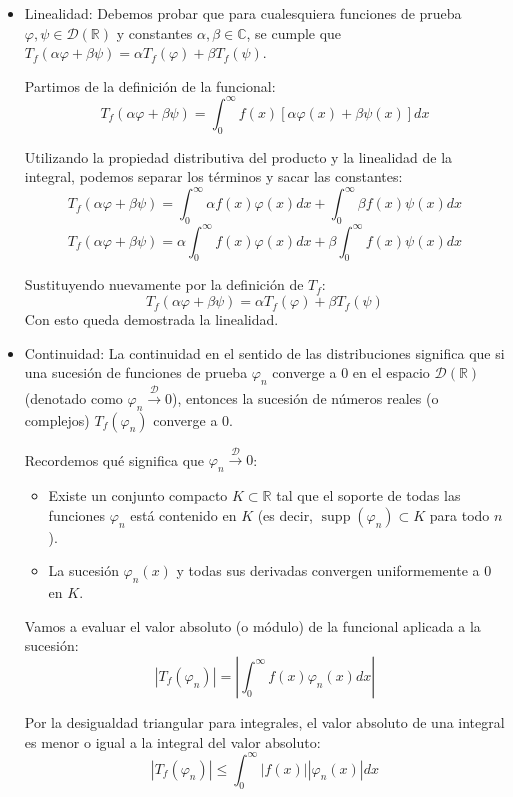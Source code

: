 \documentclass[11pt,spanish]{article}
\begin{document}
\begin{itemize}
\item Linealidad:
Debemos probar que para cualesquiera funciones de prueba $\varphi, \psi \in \mathcal{D}(\mathbb{R})$ y constantes $\alpha, \beta \in \mathbb{C}$, se cumple que $T_f(\alpha\varphi + \beta\psi) = \alpha T_f(\varphi) + \beta T_f(\psi)$.

Partimos de la definición de la funcional:
$$T_f(\alpha\varphi + \beta\psi) = \int_0^{\infty} f(x) \left[ \alpha\varphi(x) + \beta\psi(x) \right] dx$$

Utilizando la propiedad distributiva del producto y la linealidad de la integral, podemos separar los términos y sacar las constantes:
$$T_f(\alpha\varphi + \beta\psi) = \int_0^{\infty} \alpha f(x)\varphi(x) dx + \int_0^{\infty} \beta f(x)\psi(x) dx$$
$$T_f(\alpha\varphi + \beta\psi) = \alpha \int_0^{\infty} f(x)\varphi(x) dx + \beta \int_0^{\infty} f(x)\psi(x) dx$$

Sustituyendo nuevamente por la definición de $T_f$:
$$T_f(\alpha\varphi + \beta\psi) = \alpha T_f(\varphi) + \beta T_f(\psi)$$
Con esto queda demostrada la linealidad.

\item Continuidad:
La continuidad en el sentido de las distribuciones significa que si una sucesión de funciones de prueba $\varphi_n$ converge a $0$ en el espacio $\mathcal{D}(\mathbb{R})$ (denotado como $\varphi_n \xrightarrow{\mathcal{D}} 0$), entonces la sucesión de números reales (o complejos) $T_f(\varphi_n)$ converge a $0$.

Recordemos qué significa que $\varphi_n \xrightarrow{\mathcal{D}} 0$:
\begin{itemize}
\item Existe un conjunto compacto $K \subset \mathbb{R}$ tal que el soporte de todas las funciones $\varphi_n$ está contenido en $K$ (es decir, $\operatorname{supp}(\varphi_n) \subset K$ para todo $n$).
\item La sucesión $\varphi_n(x)$ y todas sus derivadas convergen uniformemente a $0$ en $K$.
\end{itemize}

Vamos a evaluar el valor absoluto (o módulo) de la funcional aplicada a la sucesión:
$$|T_f(\varphi_n)| = \left| \int_0^{\infty} f(x)\varphi_n(x) dx \right|$$

Por la desigualdad triangular para integrales, el valor absoluto de una integral es menor o igual a la integral del valor absoluto:
$$|T_f(\varphi_n)| \le \int_0^{\infty} |f(x)| |\varphi_n(x)| dx$$


\end{itemize}
\end{document}
